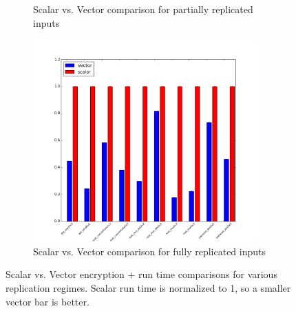 \begin{figure}
\begin{subfigure}{0.3\textwidth}
        \caption{Scalar vs. Vector comparison for partially replicated inputs}
    \end{subfigure}
    \begin{subfigure}{0.3\textwidth}
        \includegraphics[width=0.95\textwidth]{figures/graphs/DataReplicatedENC+RUN.png}
        \caption{Scalar vs. Vector comparison for fully replicated inputs}
    \end{subfigure}
    \caption{Scalar vs. Vector encryption + run time comparisons for various replication regimes. Scalar run time is normalized to 1, so a smaller vector bar is better.}
\end{figure}